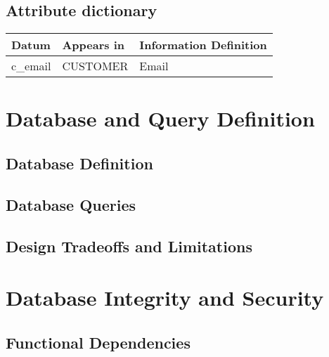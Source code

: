 \documentclass[11pt, a4paper]{report}
\begin{document}
\clearpage
\section{Attribute dictionary}

\begin{longtable}{|l|p{4.4cm}|p{7cm}|}

\hline
\textbf{Datum}      & \textbf{Appears in}    & \textbf{Information Definition} \\ \hline

c\_email            & CUSTOMER               & Email                           \\ \hline

\end{longtable}

\chapter{Database and Query Definition}

\section{Database Definition}

\clearpage
\section{Database Queries}

\clearpage
\section{Design Tradeoffs and Limitations}

\chapter{Database Integrity and Security}

\section{Functional Dependencies}
\end{document}
